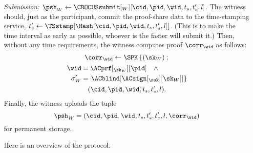 \emph{Submission: \(\psh_W\gets \CROCUSsubmit[_W][\cid, \pid, \wid, t_s, t_s', 
    l]\).}
The witness should, just as the participant, commit the proof-share data to the 
time-stamping service, \(t_e'\gets \TSstamp[\Hash[\cid, \pid, \wid, t_s, t_s', 
  l]]\).
(This is to make the time interval as early as possible, whoever is the faster 
will submit it.)
Then, without any time requirements, the witness computes  proof 
\(\corr_{\wid}\) as follows:
\begin{multline*}
  \corr_{\wid}\gets \SPK\left\{ (\sk_W) : \right. \\
    \begin{aligned}
      \wid &= \ACprf[_{\sk_W}][\pid] \quad \land \\
      \sigma_W' &= \left. \ACblind[\ACsign[_{\ssk}][\sk_W]] \right\}
    \end{aligned} \\
      (\cid, \pid, \wid, t_s, t_s', l).
\end{multline*}
Finally, the witness uploads the tuple \[
  \psh_W = (\cid, \pid, \wid, t_s, t_s', t_e', l, \corr_{\wid})
\] for permanent storage.

Here is an overview of the protocol.


